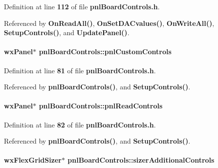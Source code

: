Definition at line {\bf 112} of file {\bf pnl\+Board\+Controls.\+h}.



Referenced by {\bf On\+Read\+All()}, {\bf On\+Set\+D\+A\+Cvalues()}, {\bf On\+Write\+All()}, {\bf Setup\+Controls()}, and {\bf Update\+Panel()}.

\paragraph[{pnl\+Custom\+Controls}]{\setlength{\rightskip}{0pt plus 5cm}wx\+Panel$\ast$ pnl\+Board\+Controls\+::pnl\+Custom\+Controls\hspace{0.3cm}{\ttfamily [protected]}}\label{classpnlBoardControls_a5c3d01c9fd6b3cb7ec8e9b61f19daa27}


Definition at line {\bf 81} of file {\bf pnl\+Board\+Controls.\+h}.



Referenced by {\bf pnl\+Board\+Controls()}, and {\bf Setup\+Controls()}.

\paragraph[{pnl\+Read\+Controls}]{\setlength{\rightskip}{0pt plus 5cm}wx\+Panel$\ast$ pnl\+Board\+Controls\+::pnl\+Read\+Controls\hspace{0.3cm}{\ttfamily [protected]}}\label{classpnlBoardControls_a5cbded08f0a32e1e24f25e94bb09f13c}


Definition at line {\bf 82} of file {\bf pnl\+Board\+Controls.\+h}.



Referenced by {\bf pnl\+Board\+Controls()}, and {\bf Setup\+Controls()}.

\paragraph[{sizer\+Additional\+Controls}]{\setlength{\rightskip}{0pt plus 5cm}wx\+Flex\+Grid\+Sizer$\ast$ pnl\+Board\+Controls\+::sizer\+Additional\+Controls\hspace{0.3cm}{\ttfamily [protected]}}\label{classpnlBoardControls_a0e32225fc511168023dfa6856e69e862}


